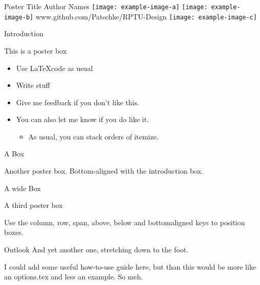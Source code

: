 \documentclass[
  a0paper,
  portrait,
  fontscale=.35 %
  ]{baposterrptu}
\begin{document}
\begin{poster}{
  }
  {\color{color_accents}\rptuLogo\hspace{1cm}}
  {\color{white}Poster Title}
  {\color{white}Author Names}
  {\texttt{[image: example-image-a]}}
  \footer
  {\hfill
    \texttt{[image: example-image-b]}
    \hfill
    \color{white} \huge www.github.com/Patschke/RPTU-Design
    \hfill
    \texttt{[image: example-image-c]}
    \hfill}
  \begin{posterbox}[name=intro,column=0,row=0]{Introduction}

    This is a poster box

    \begin{itemize}
      \item Use \LaTeX code as usual
      \item Write stuff
      \item Give me feedback if you don't like this.
      \item You can also let me know if you do like it.
            \begin{itemize}
              \item As usual, you can stack orders of itemize.
            \end{itemize}
    \end{itemize}

  \end{posterbox}

  \begin{posterbox}[name=test,column=1,row=0, bottomaligned=intro]{A Box}

    Another poster box. Bottom-aligned with the introduction box.

  \end{posterbox}

  \begin{posterbox}[name=test2,column=0,below=intro, span=2]{A wide Box}

    A third poster box

    Use the column, row, span, above, below and bottomaligned keys to position boxes.

  \end{posterbox}

  \begin{posterbox}[above=foot, below=test2, column=1]{Outlook}
    And yet another one, stretching down to the foot.

    I could add some useful how-to-use guide here, but than this would be more like an options.tex and less an example. So meh.
  \end{posterbox}

\end{poster}
\end{document}
